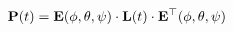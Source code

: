 \vspace{-0.1cm}
\begin{equation}
    \mathbf{P}(t) = \mathbf{E}(\phi, \theta, \psi) \cdot \mathbf{L}(t) \cdot \mathbf{E}^\top(\phi, \theta, \psi)
    \label{eq:uxo-P}
    \vspace{-0.05cm}
\end{equation}
